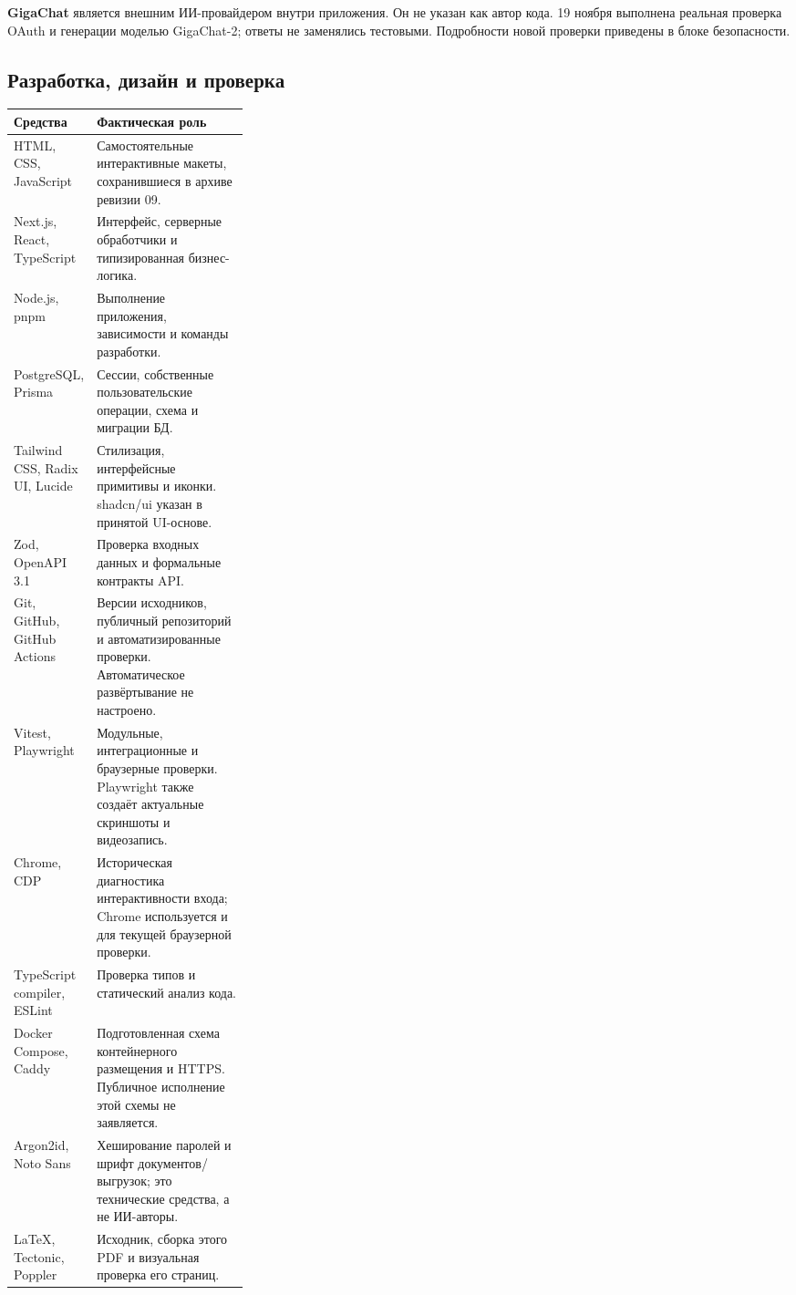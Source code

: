 \documentclass[11pt,a4paper]{article}
\begin{document}
\textbf{GigaChat} является внешним ИИ-провайдером внутри приложения. Он не указан как автор кода. 19 ноября выполнена реальная проверка OAuth и генерации моделью GigaChat-2; ответы не заменялись тестовыми. Подробности новой проверки приведены в блоке безопасности.

\subsection{Разработка, дизайн и проверка}
\begin{tabularx}{\linewidth}{@{}p{0.30\linewidth}X@{}}
\toprule\textbf{Средства}&\textbf{Фактическая роль}\\\midrule
HTML, CSS, JavaScript & Самостоятельные интерактивные макеты, сохранившиеся в архиве ревизии 09.\\
Next.js, React, TypeScript & Интерфейс, серверные обработчики и типизированная бизнес-логика.\\
Node.js, pnpm & Выполнение приложения, зависимости и команды разработки.\\
PostgreSQL, Prisma & Сессии, собственные пользовательские операции, схема и миграции БД.\\
Tailwind CSS, Radix UI, Lucide & Стилизация, интерфейсные примитивы и иконки. shadcn/ui указан в принятой UI-основе.\\
Zod, OpenAPI 3.1 & Проверка входных данных и формальные контракты API.\\
Git, GitHub, GitHub Actions & Версии исходников, публичный репозиторий и автоматизированные проверки. Автоматическое развёртывание не настроено.\\
Vitest, Playwright & Модульные, интеграционные и браузерные проверки. Playwright также создаёт актуальные скриншоты и видеозапись.\\
Chrome, CDP & Историческая диагностика интерактивности входа; Chrome используется и для текущей браузерной проверки.\\
TypeScript compiler, ESLint & Проверка типов и статический анализ кода.\\
Docker Compose, Caddy & Подготовленная схема контейнерного размещения и HTTPS. Публичное исполнение этой схемы не заявляется.\\
Argon2id, Noto Sans & Хеширование паролей и шрифт документов/выгрузок; это технические средства, а не ИИ-авторы.\\
LaTeX, Tectonic, Poppler & Исходник, сборка этого PDF и визуальная проверка его страниц.\\
\bottomrule
\end{tabularx}
\end{document}
